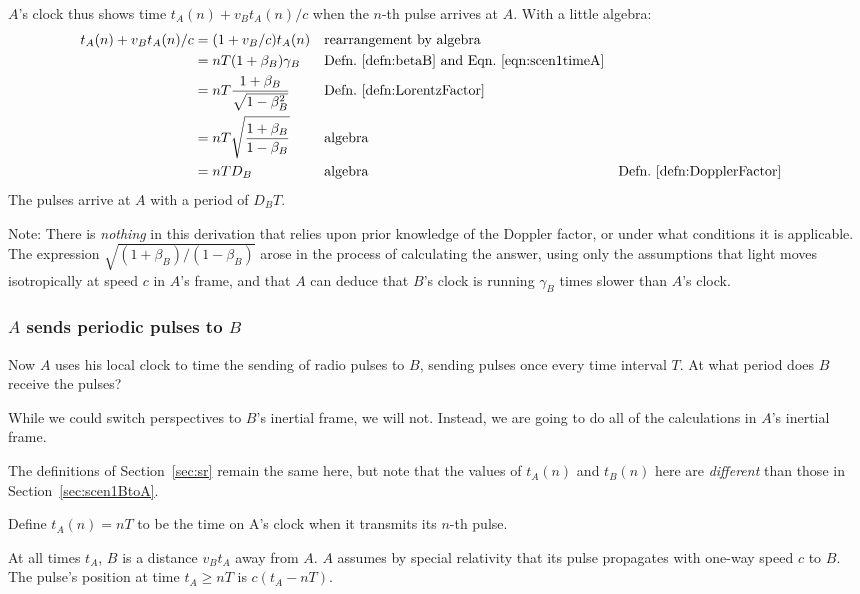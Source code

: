 \documentclass[a4paper]{article}
\theoremstyle{plain}
\theoremstyle{definition}
\begin{document}
$A$'s clock thus shows time $t_A(n) + v_B t_A(n)/c$ when the $n$-th
pulse arrives at $A$.  With a little algebra:
\begin{align*}
t_A(n) + v_B t_A(n)/c
  & = (1 + v_B/c) t_A(n) & & \text{rearrangement by algebra} \\
  & = nT (1 + \beta_{B}) \gamma_{B} & & \text{Defn.~\eqref{defn:betaB} and Eqn.~\eqref{eqn:scen1timeA}} \\
  & = nT \frac{1 + \beta_B}{\sqrt{ 1 - \beta_{B}^2 }} & & \text{Defn.~\eqref{defn:LorentzFactor}} \\
  & = nT \sqrt{ \frac{1 + \beta_B}{1 - \beta_B} } & & \text{algebra} \\
  & = nT D_B & & \text{algebra} & & \text{Defn.~\eqref{defn:DopplerFactor}}
\end{align*}
The pulses arrive at $A$ with a period of $D_B T$.

Note: There is {\em nothing} in this derivation that relies upon prior
knowledge of the Doppler factor, or under what conditions it is
applicable.  The expression $\sqrt{(1+\beta_B)/(1-\beta_B)}$ arose in
the process of calculating the answer, using only the assumptions that
light moves isotropically at speed $c$ in $A$'s frame, and that $A$
can deduce that $B$'s clock is running $\gamma_B$ times slower than
$A$'s clock.


\subsubsection{$A$ sends periodic pulses to $B$}
\label{sec:scen1AtoB}

Now $A$ uses his local clock to time the sending of radio pulses to $B$,
sending pulses once every time interval $T$.
At what period does $B$ receive the pulses?

While we could switch perspectives to $B$'s inertial frame, we will
not.  Instead, we are going to do all of the calculations in $A$'s
inertial frame.

The definitions of Section~\ref{sec:sr} remain the same here, but note
that the values of $t_A(n)$ and $t_B(n)$ here are {\em different} than
those in Section~\ref{sec:scen1BtoA}.

Define $t_A(n) = nT$ to be the time on A's clock when it transmits its
$n$-th pulse.

At all times $t_A$, $B$ is a distance $v_B t_A$ away from $A$.  $A$
assumes by special relativity that its pulse propagates with one-way
speed $c$ to $B$.  The pulse's position at time $t_A \geq nT$ is
$c(t_A - nT)$.
\end{document}
